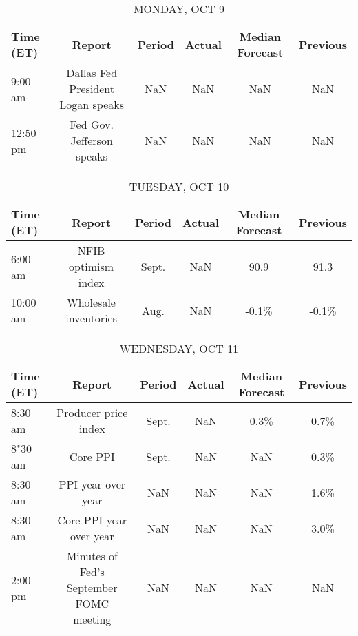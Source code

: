 \documentclass{article}%
\begin{document}
%
\normalsize%


\begin{table}[htbp]%
\caption{MONDAY, OCT 9}%
\centering%
\begin{adjustbox}{width=1\textwidth}%
\begin{tabular}{lccccc}
\toprule
Time (ET) &                            Report & Period & Actual & Median Forecast & Previous \\
\midrule
  9:00 am & Dallas Fed President Logan speaks &    NaN &    NaN &             NaN &      NaN \\
 12:50 pm &         Fed Gov. Jefferson speaks &    NaN &    NaN &             NaN &      NaN \\
\bottomrule
\end{tabular}
%
\end{adjustbox}%
\end{table}

%


\begin{table}[htbp]%
\caption{TUESDAY, OCT 10}%
\centering%
\begin{adjustbox}{width=1\textwidth}%
\begin{tabular}{lccccc}
\toprule
Time (ET) &                Report & Period & Actual & Median Forecast & Previous \\
\midrule
  6:00 am &   NFIB optimism index &  Sept. &    NaN &            90.9 &     91.3 \\
 10:00 am & Wholesale inventories &   Aug. &    NaN &           -0.1\% &    -0.1\% \\
\bottomrule
\end{tabular}
%
\end{adjustbox}%
\end{table}

%


\begin{table}[htbp]%
\caption{WEDNESDAY, OCT 11}%
\centering%
\begin{adjustbox}{width=1\textwidth}%
\begin{tabular}{lccccc}
\toprule
Time (ET) &                                  Report & Period & Actual & Median Forecast & Previous \\
\midrule
  8:30 am &                    Producer price index &  Sept. &    NaN &            0.3\% &     0.7\% \\
  8"30 am &                                Core PPI &  Sept. &    NaN &             NaN &     0.3\% \\
  8:30 am &                      PPI year over year &    NaN &    NaN &             NaN &     1.6\% \\
  8:30 am &                 Core PPI year over year &    NaN &    NaN &             NaN &     3.0\% \\
  2:00 pm & Minutes of Fed's September FOMC meeting &    NaN &    NaN &             NaN &      NaN \\
\bottomrule
\end{tabular}
%
\end{adjustbox}%
\end{table}
\end{document}
